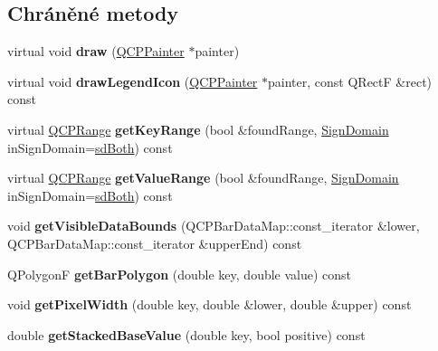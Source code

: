 \subsection*{Chráněné metody}
\begin{DoxyCompactItemize}
\item 
\hypertarget{classQCPBars_a42b894e34dac799f90ff3700706b31df}{}virtual void {\bfseries draw} (\hyperlink{classQCPPainter}{Q\+C\+P\+Painter} $\ast$painter)\label{classQCPBars_a42b894e34dac799f90ff3700706b31df}

\item 
\hypertarget{classQCPBars_ad4fb35d2ab7d2aa460a6612aff3e7a15}{}virtual void {\bfseries draw\+Legend\+Icon} (\hyperlink{classQCPPainter}{Q\+C\+P\+Painter} $\ast$painter, const Q\+Rect\+F \&rect) const \label{classQCPBars_ad4fb35d2ab7d2aa460a6612aff3e7a15}

\item 
\hypertarget{classQCPBars_a93cfdc8a535f36aeb087acca49c00662}{}virtual \hyperlink{classQCPRange}{Q\+C\+P\+Range} {\bfseries get\+Key\+Range} (bool \&found\+Range, \hyperlink{classQCPAbstractPlottable_a661743478a1d3c09d28ec2711d7653d8}{Sign\+Domain} in\+Sign\+Domain=\hyperlink{classQCPAbstractPlottable_a661743478a1d3c09d28ec2711d7653d8a082b98cfb91a7363a3b5cd17b0c1cd60}{sd\+Both}) const \label{classQCPBars_a93cfdc8a535f36aeb087acca49c00662}

\item 
\hypertarget{classQCPBars_ada96e20309570d1488c165596cb2647f}{}virtual \hyperlink{classQCPRange}{Q\+C\+P\+Range} {\bfseries get\+Value\+Range} (bool \&found\+Range, \hyperlink{classQCPAbstractPlottable_a661743478a1d3c09d28ec2711d7653d8}{Sign\+Domain} in\+Sign\+Domain=\hyperlink{classQCPAbstractPlottable_a661743478a1d3c09d28ec2711d7653d8a082b98cfb91a7363a3b5cd17b0c1cd60}{sd\+Both}) const \label{classQCPBars_ada96e20309570d1488c165596cb2647f}

\item 
\hypertarget{classQCPBars_af73d2032be0a64d2692bb76b08c79ec2}{}void {\bfseries get\+Visible\+Data\+Bounds} (Q\+C\+P\+Bar\+Data\+Map\+::const\+\_\+iterator \&lower, Q\+C\+P\+Bar\+Data\+Map\+::const\+\_\+iterator \&upper\+End) const \label{classQCPBars_af73d2032be0a64d2692bb76b08c79ec2}

\item 
\hypertarget{classQCPBars_a1d118a76662cfd691a78c6f573e3f78c}{}Q\+Polygon\+F {\bfseries get\+Bar\+Polygon} (double key, double value) const \label{classQCPBars_a1d118a76662cfd691a78c6f573e3f78c}

\item 
\hypertarget{classQCPBars_a794eefe4fb29b9b40583654ccbf460dc}{}void {\bfseries get\+Pixel\+Width} (double key, double \&lower, double \&upper) const \label{classQCPBars_a794eefe4fb29b9b40583654ccbf460dc}

\item 
\hypertarget{classQCPBars_ae9b0c2fad9f29030c84bb6e62a4b605f}{}double {\bfseries get\+Stacked\+Base\+Value} (double key, bool positive) const \label{classQCPBars_ae9b0c2fad9f29030c84bb6e62a4b605f}

\end{DoxyCompactItemize}
